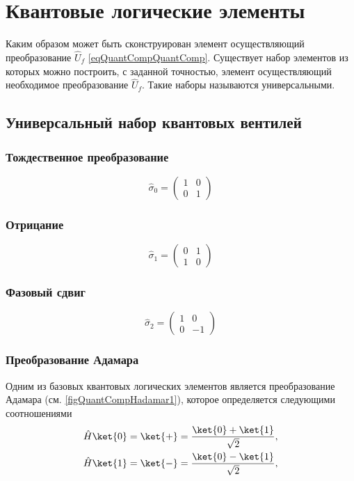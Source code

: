 \section{Квантовые логические элементы}
Каким образом может быть сконструирован элемент осуществляющий
преобразование $\hat{U}_f$ \eqref{eqQuantCompQuantComp}. Существует
набор элементов из которых можно построить, с заданной точностью,
элемент осуществляющий необходимое преобразование $\hat{U}_f$. Такие
наборы называются универсальными. 

\subsection{Универсальный набор квантовых вентилей}

\subsubsection{Тождественное преобразование}

\[
\hat{\sigma}_0 = \begin{pmatrix}
1 & 0 \\
0 & 1
\end{pmatrix}
\]

\subsubsection{Отрицание}

\[
\hat{\sigma}_1 = \begin{pmatrix}
0 & 1 \\
1 & 0
\end{pmatrix}
\]

\subsubsection{Фазовый сдвиг}

\[
\hat{\sigma}_2 = \begin{pmatrix}
1 & 0 \\
0 & -1
\end{pmatrix}
\]

\subsubsection{Преобразование Адамара}
Одним из базовых квантовых логических элементов является
преобразование Адамара (см. \autoref{figQuantCompHadamar1}), которое
определяется следующими соотношениями
\begin{eqnarray}
\hat{H} \ket{0} = \ket{+} =  
\frac{\ket{0} + \ket{1} }{\sqrt{2}},
\nonumber \\
\hat{H} \ket{1} = \ket{-} = 
\frac{\ket{0} - \ket{1} }{\sqrt{2}},
\nonumber
\end{eqnarray}

